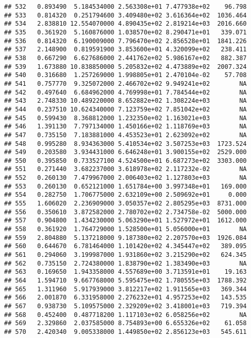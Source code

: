\documentclass[
]{article}
\begin{document}
\begin{verbatim}
## 532   0.893490  5.184534000 2.563308e+01 7.477938e+02    96.798
## 533   0.814320  0.251794600 3.409480e+02 3.616364e+02  1036.464
## 534   2.838810 12.554070000 4.890435e+02 2.819214e+03  2016.660
## 535   0.361920  5.160876000 1.038570e+02 8.290471e+01   339.071
## 536   0.814320  6.190009000 7.796470e+02 2.856528e+01  1841.226
## 537   2.148900  0.819591900 3.853600e+01 4.320099e+02   238.411
## 538   0.667290  6.627686000 2.441762e+02 5.986167e+02   882.387
## 539   1.673880 10.838850000 5.205832e+02 4.473889e+02  2007.324
## 540   0.316680  1.257269000 1.998805e+01 2.470104e-02    57.708
## 541   0.757770  9.325072000 2.466702e+02 9.949241e+02        NA
## 542   0.497640  6.684962000 4.769998e+01 7.784544e+02        NA
## 543   2.748330 10.489220000 8.652882e+02 1.308224e+03        NA
## 544   0.237510 10.624340000 7.123759e+02 7.851042e+02        NA
## 545   0.599430  8.368812000 1.232350e+02 1.163021e+03        NA
## 546   1.391130  7.797134000 1.450166e+02 1.118769e+03        NA
## 547   0.735150  7.183881000 4.453523e+01 2.623092e+02        NA
## 548   0.995280  8.934363000 5.410534e+02 3.507253e+03  1723.524
## 549   0.203580  3.934431000 6.646248e+01 3.900155e+02  2529.000
## 550   0.395850  0.733527100 4.524500e+01 6.687273e+02  3303.000
## 551   0.271440  3.682237000 3.618978e+02 2.117232e-02        NA
## 552   0.260130  7.479967000 2.006403e+02 1.127803e+03        NA
## 553   0.260130  0.652121000 1.651784e+00 3.997348e+01   169.000
## 554   0.282750  1.706775000 2.632109e+00 2.509692e+01     0.000
## 555   1.606020  2.236909000 3.050357e+02 2.805295e+03  8731.000
## 556   0.350610  3.872582000 2.780702e+02 2.734758e-02  5000.000
## 557   0.904800  1.434230000 5.063290e+01 1.527972e+01  1612.000
## 558   0.361920  1.764729000 1.528500e+01 5.056000e+01        NA
## 559   2.804880  5.137218000 9.187380e+02 2.207570e+03  1926.084
## 560   0.644670  6.781464000 1.101420e+02 4.345447e+02   389.095
## 561   0.294060  3.199987000 1.931860e+02 3.215290e+02   624.345
## 562   0.735150  2.724380000 1.838790e+02 1.383490e+03        NA
## 563   0.169650  1.943358000 4.557689e+00 3.713591e+01    19.163
## 564   1.594710  9.667768000 5.595475e+02 1.780555e+03  1788.392
## 565   1.311960  5.917939000 3.812217e+02 1.911565e+03   369.344
## 566   2.001870  6.331958000 2.276232e+01 4.957253e+02   143.535
## 567   0.938730  5.109575000 2.329209e+02 3.418001e+03   719.394
## 568   0.452400  0.487718200 1.117103e+02 6.058256e+02        NA
## 569   2.329860  2.037585000 8.754893e+00 6.655326e+02    61.058
## 570   2.420340  9.005338000 1.449850e+02 2.856123e+03   545.611

\end{verbatim}
\end{document}
